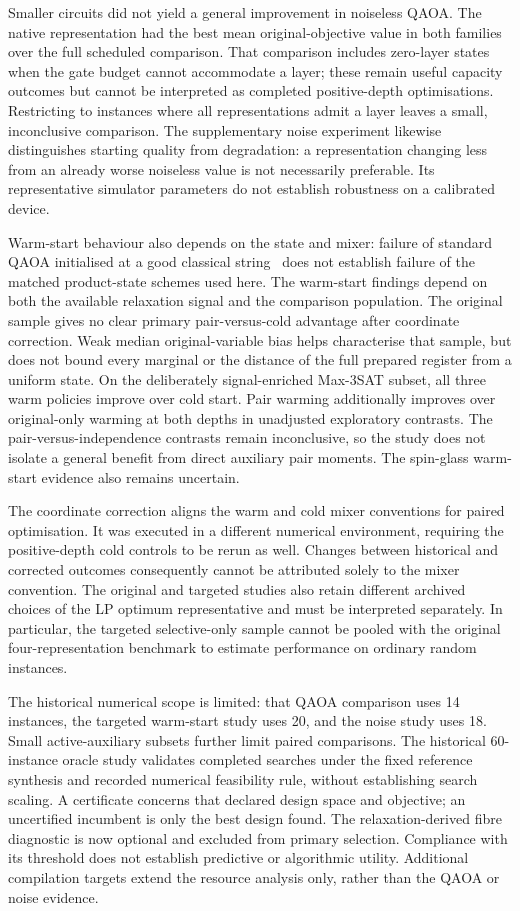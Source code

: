 \documentclass[a4paper,onecolumn,11pt,unpublished]{quantumarticle}
\theoremstyle{remark}
\begin{document}
Smaller circuits did not yield a general improvement in noiseless QAOA.
The native representation had the best mean original-objective value in both
families over the full scheduled comparison. That comparison includes
zero-layer states when the gate budget cannot accommodate a layer; these
remain useful capacity outcomes but cannot be interpreted as completed
positive-depth optimisations. Restricting to instances where all
representations admit a layer leaves a small, inconclusive comparison.
The supplementary noise experiment likewise distinguishes starting quality
from degradation: a representation changing less from an already worse
noiseless value is not necessarily preferable. Its representative simulator
parameters do not establish robustness on a calibrated device.

Warm-start behaviour also depends on the state and mixer: failure of
standard QAOA initialised at a good classical string~\cite{Cain2023}
does not establish failure of the matched product-state schemes used here.
The warm-start findings depend on both the available relaxation signal and
the comparison population. The original sample gives no clear primary
pair-versus-cold advantage after coordinate correction. Weak median
original-variable bias helps characterise that sample, but does not bound
every marginal or the distance of the full prepared register from a uniform
state. On the deliberately signal-enriched Max-3SAT subset, all three warm
policies improve over cold start. Pair warming additionally improves over
original-only warming at both depths in unadjusted exploratory contrasts.
The pair-versus-independence contrasts remain inconclusive, so the study does
not isolate a general benefit from direct auxiliary pair moments. The
spin-glass warm-start evidence also remains uncertain.

The coordinate correction aligns the warm and cold mixer conventions for
paired optimisation. It was executed in a different numerical environment,
requiring the positive-depth cold controls to be rerun as well. Changes
between historical and corrected outcomes consequently cannot be attributed
solely to the mixer convention. The original and targeted studies also
retain different archived choices of the LP optimum representative and
must be interpreted separately. In particular, the targeted selective-only
sample cannot be pooled with the original four-representation benchmark
to estimate performance on ordinary random instances.

The historical numerical scope is limited: that QAOA comparison uses
14 instances, the targeted warm-start study uses 20, and the noise study
uses 18. Small active-auxiliary subsets further limit paired comparisons.
The historical 60-instance oracle study validates completed searches under the fixed
reference synthesis and recorded numerical feasibility rule, without
establishing search scaling. A certificate concerns that declared design
space and objective; an uncertified incumbent is only the best design
found. The relaxation-derived fibre diagnostic is now optional and excluded from
primary selection. Compliance with its threshold does not establish
predictive or algorithmic utility.
Additional compilation targets extend the resource analysis only, rather
than the QAOA or noise evidence.
\end{document}
